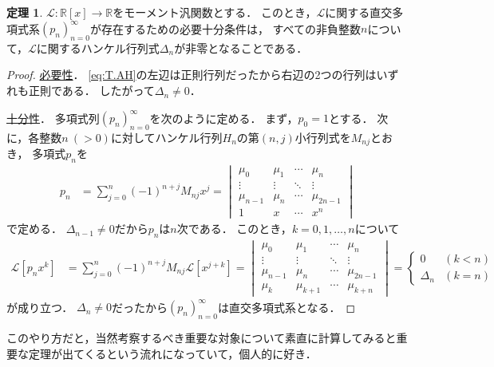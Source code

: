 \documentclass{jlreq}
\theoremstyle{definition}
\newtheorem{theorem}{定理}
\newcommand{\functype}[3]{#1\colon#2\longrightarrow#3}
\newcommand{\mcL}{\mathcal{L}}
\newcommand{\polynoms}[2]{#1[#2]}
\newcommand{\realnums}{\mathbb{R}}
\newcommand{\sequence}[3]{\sequenceparen{#1}{#2}{#3}{(}{)}} %
\newcommand{\sequenceparen}[5]{{#4#1#5}_{#2}^{#3}}
\begin{document}
\begin{theorem}
  \(\functype{\mcL}{\polynoms{\realnums}{x}}{\realnums}\)をモーメント汎関数とする．
  このとき，\(\mcL\)に関する直交多項式系\(\sequence{p_n}{n=0}{\infty}\)が存在するための必要十分条件は，
  すべての非負整数\(n\)について，\(\mcL\)に関するハンケル行列式\(\Delta_n\)が非零となることである\cite[p. 11, Theorem 3.1]{Chihara2011}．
\end{theorem}
\begin{proof}
  \underline{必要性}．
  \cref{eq:T.AH}の左辺は正則行列だったから右辺の2つの行列はいずれも正則である．
  したがって\(\Delta_n\neq0\)．

  \underline{十分性}．
  多項式列\(\sequence{p_n}{n=0}{\infty}\)を次のように定める．
  まず，\(p_0=1\)とする．
  次に，各整数\(n\:(>0)\)に対してハンケル行列\(H_n\)の第\((n,j)\)小行列式を\(M_{nj}\)とおき，
  多項式\(p_n\)を
  \begin{align}
    p_n &= \sum_{j=0}^n (-1)^{n+j} M_{nj} x^j
    =
    \begin{vmatrix}
      \mu_0 & \mu_1 & \cdots & \mu_n \\
      \vdots & \vdots & \ddots & \vdots \\
      \mu_{n-1} & \mu_n & \cdots & \mu_{2n-1} \\
      1 & x & \cdots & x^n
    \end{vmatrix}
  \end{align}
  で定める．
  \(\Delta_{n-1}\neq0\)だから\(p_n\)は\(n\)次である．
  このとき，\(k=0,1,\dots,n\)について
  \begin{align}
    \mcL[p_n x^k]
    &= \sum_{j=0}^n (-1)^{n+j} M_{nj} \mcL[x^{j+k}]
    =
    \begin{vmatrix}
      \mu_0 & \mu_1 & \cdots & \mu_n \\
      \vdots & \vdots & \ddots & \vdots \\
      \mu_{n-1} & \mu_n & \cdots & \mu_{2n-1} \\
      \mu_{k} & \mu_{k+1} & \cdots & \mu_{k+n}
    \end{vmatrix}
    =
    \begin{cases}
      0 & (k<n) \\
      \Delta_n & (k=n)
    \end{cases}
  \end{align}
  が成り立つ．
  \(\Delta_n\neq0\)だったから\(\sequence{p_n}{n=0}{\infty}\)は直交多項式系となる．
\end{proof}

このやり方だと，当然考察するべき重要な対象について素直に計算してみると重要な定理が出てくるという流れになっていて，個人的に好き．

\printbibliography[title={参考文献}]
\end{document}
